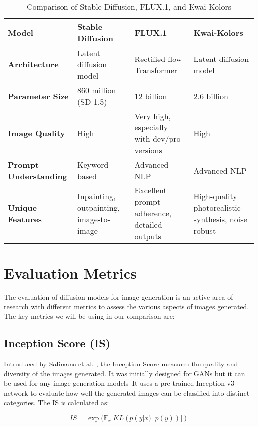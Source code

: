 \documentclass{article}
\begin{document}
\begin{table}
  \centering
  \begin{tabular}{p{1.5in} p{1.5in} p{1.5in} p{1.5in}}
    \toprule
    \textbf{Model} & \textbf{Stable Diffusion} & \textbf{FLUX.1} & \textbf{Kwai-Kolors} \\
    \midrule
    \textbf{Architecture} & Latent diffusion model & Rectified flow Transformer & Latent diffusion model \\
    \textbf{Parameter Size} & 860 million (SD 1.5) & 12 billion & 2.6 billion \\
    \textbf{Image Quality} & High & Very high, especially with dev/pro versions & High \\
    \textbf{Prompt Understanding} & Keyword-based & Advanced NLP & Advanced NLP \\
    \textbf{Unique Features} & Inpainting, outpainting, image-to-image & Excellent prompt adherence, detailed outputs & High-quality photorealistic synthesis, noise robust \\
    \bottomrule
  \end{tabular}
  \label{tab:comparison}
  \caption{Comparison of Stable Diffusion, FLUX.1, and Kwai-Kolors}
\end{table}

\section{Evaluation Metrics}
The evaluation of diffusion models for image generation is an active area of research with different metrics to assess the various
aspects of images generated. The key metrics we will be using in our comparison are:

\subsection{Inception Score (IS)}

Introduced by Salimans et al. \cite{salimans2016improved}, the Inception Score measures the quality and diversity of the images generated.
It was initially designed for GANs but it can be used for any image generation models. It uses a pre-trained Inception v3 network to 
evaluate how well the generated images can be classified into distinct categories. The IS is calculated as:

\begin{equation}
    IS = \exp(\mathbb{E}_x[KL(p(y|x) || p(y))])
\end{equation}
\end{document}
